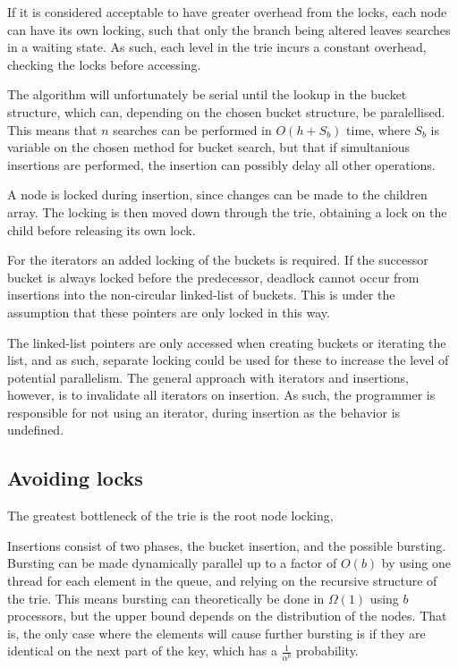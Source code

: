 If it is considered acceptable to have greater overhead from the locks, each
node can have its own locking, such that only the branch being altered
leaves searches in a waiting state. As such, each level in the trie incurs a
constant overhead, checking the locks before accessing.

The algorithm will unfortunately be serial until the lookup in the bucket
structure, which can, depending on the chosen bucket structure, be
paralellised. This means that $n$ searches can be performed in $O(h+S_b)$ time,
where $S_b$ is variable on the chosen method for bucket search, but that if
simultanious insertions are performed, the insertion can possibly delay all
other operations. 

A node is locked during insertion, since changes can be made to the children
array. The locking is then moved down through the trie, obtaining a lock on
the child before releasing its own lock.

For the iterators an added locking of the buckets is required. If the
successor bucket is always locked before the predecessor, deadlock cannot occur
from insertions into the non-circular linked-list of buckets. This is under
the assumption that these pointers are only locked in this way.

The linked-list pointers are only accessed when creating buckets or iterating
the list, and as such, separate locking could be used for these to increase
the level of potential parallelism. The general approach with iterators and
insertions, however, is to invalidate all iterators on insertion. As such,
the programmer is responsible for not using an iterator, during insertion
as the behavior is undefined.

\subsection{Avoiding locks}
The greatest bottleneck of the trie is the root node locking,

Insertions consist of two phases, the bucket insertion, and the possible
bursting. Bursting can be made dynamically parallel up to a factor of $O(b)$ by
using one thread for each element in the queue, and relying on the recursive
structure of the trie. This means bursting can theoretically be done in
$\Omega(1)$ using $b$ processors, but the upper bound depends on the
distribution of the nodes. That is, the only case where the elements will cause
further bursting is if they are identical on the next part of the key, which
has a $\frac{1}{\alpha^b}$ probability.

